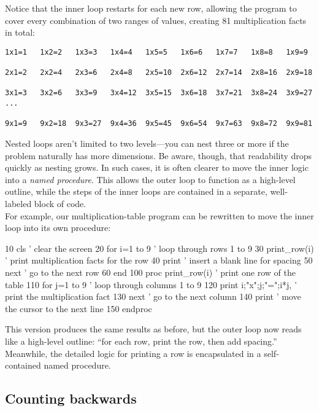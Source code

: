 Notice that the inner loop restarts for each new row, allowing the program to cover every combination of two ranges of values, creating 81 multiplication facts in total:

\begin{lstlisting}[style=output]
1x1=1   1x2=2   1x3=3   1x4=4   1x5=5   1x6=6   1x7=7   1x8=8   1x9=9

2x1=2   2x2=4   2x3=6   2x4=8   2x5=10  2x6=12  2x7=14  2x8=16  2x9=18

3x1=3   3x2=6   3x3=9   3x4=12  3x5=15  3x6=18  3x7=21  3x8=24  3x9=27
...

9x1=9   9x2=18  9x3=27  9x4=36  9x5=45  9x6=54  9x7=63  9x8=72  9x9=81
\end{lstlisting}

Nested loops aren’t limited to two levels—you can nest three or more if the problem naturally has more dimensions. Be aware, though, that readability drops quickly as nesting grows. In such cases, it is often clearer to move the inner logic into a \emph{named procedure}. This allows the outer loop to function as a high-level outline, while the steps of the inner loops are contained in a separate, well-labeled block of code.\\

For example, our multiplication-table program can be rewritten to move the inner loop into its own procedure:

\begin{lst}
10 cls                          ' clear the screen
20 for i=1 to 9                 ' loop through rows 1 to 9
30   print_row(i)               ' print multiplication facts for the row
40   print                      ' insert a blank line for spacing
50 next                         ' go to the next row
60 end
100 proc print_row(i)           ' print one row of the table
110   for j=1 to 9              ' loop through columns 1 to 9
120     print i;"x";j;"=";i*j,  ' print the multiplication fact
130   next                      ' go to the next column
140   print                     ' move the cursor to the next line
150 endproc
\end{lst}

This version produces the same results as before, but the outer loop now reads like a high-level outline: “for each row, print the row, then add spacing.” Meanwhile, the detailed logic for printing a row is encapsulated in a self-contained named procedure.

\subsection*{Counting backwards}

